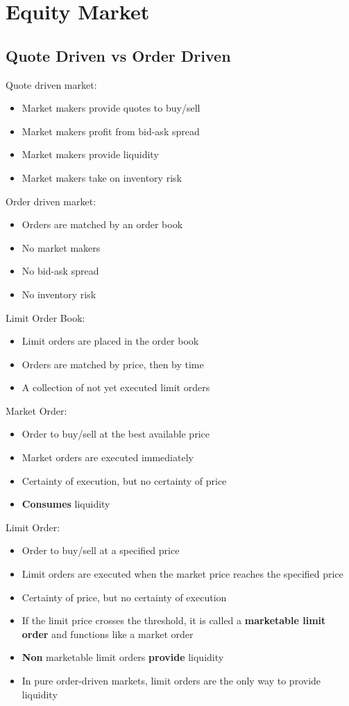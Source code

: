 \section{Equity Market}
\subsection{Quote Driven vs Order Driven}
Quote driven market:
\begin{itemize}
    \item Market makers provide quotes to buy/sell
    \item Market makers profit from bid-ask spread
    \item Market makers provide liquidity
    \item Market makers take on inventory risk
\end{itemize}

Order driven market:
\begin{itemize}
    \item Orders are matched by an order book
    \item No market makers
    \item No bid-ask spread
    \item No inventory risk
\end{itemize}

Limit Order Book:
\begin{itemize}
    \item Limit orders are placed in the order book
    \item Orders are matched by price, then by time
    \item A collection of not yet executed limit orders
\end{itemize}

Market Order:
\begin{itemize}
    \item Order to buy/sell at the best available price
    \item Market orders are executed immediately
    \item Certainty of execution, but no certainty of price
    \item \textbf{Consumes} liquidity
\end{itemize}

Limit Order:
\begin{itemize}
    \item Order to buy/sell at a specified price
    \item Limit orders are executed when the market price reaches the specified price
    \item Certainty of price, but no certainty of execution
    \item If the limit price crosses the threshold, it is called a \textbf{marketable limit order} and functions like a market order
    \item \textbf{Non} marketable limit orders \textbf{provide} liquidity
    \item In pure order-driven markets, limit orders are the only way to provide liquidity
\end{itemize}

